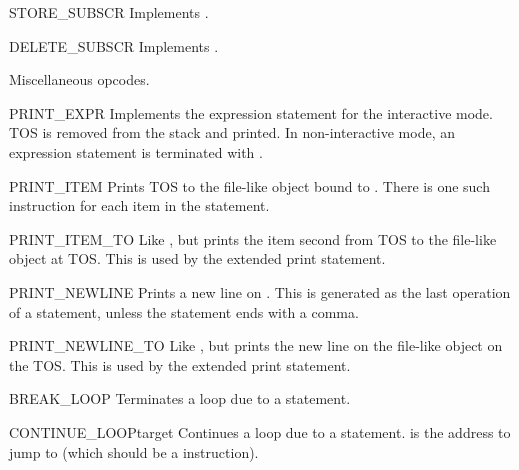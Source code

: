 \begin{opcodedesc}{STORE_SUBSCR}{}
Implements .
\end{opcodedesc}

\begin{opcodedesc}{DELETE_SUBSCR}{}
Implements .
\end{opcodedesc}

Miscellaneous opcodes.

\begin{opcodedesc}{PRINT_EXPR}{}
Implements the expression statement for the interactive mode.  TOS is
removed from the stack and printed.  In non-interactive mode, an
expression statement is terminated with .
\end{opcodedesc}

\begin{opcodedesc}{PRINT_ITEM}{}
Prints TOS to the file-like object bound to .  There
is one such instruction for each item in the  statement.
\end{opcodedesc}

\begin{opcodedesc}{PRINT_ITEM_TO}{}
Like , but prints the item second from TOS to the
file-like object at TOS.  This is used by the extended print statement.
\end{opcodedesc}

\begin{opcodedesc}{PRINT_NEWLINE}{}
Prints a new line on .  This is generated as the
last operation of a  statement, unless the statement
ends with a comma.
\end{opcodedesc}

\begin{opcodedesc}{PRINT_NEWLINE_TO}{}
Like , but prints the new line on the file-like
object on the TOS.  This is used by the extended print statement.
\end{opcodedesc}

\begin{opcodedesc}{BREAK_LOOP}{}
Terminates a loop due to a  statement.
\end{opcodedesc}

\begin{opcodedesc}{CONTINUE_LOOP}{target}
Continues a loop due to a  statement.  
is the address to jump to (which should be a 
instruction).
\end{opcodedesc}

